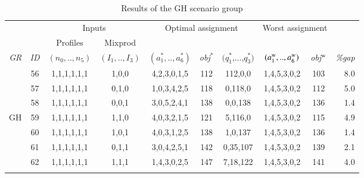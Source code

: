 \documentclass[review,12pt, 3p, times]{elsarticle}
\begin{document}
\begin{longtable}{|c|c|c|c|c|c|c|c|c|r|}
	\hline
	& & \multicolumn{2}{c|}{Inputs} & \multicolumn{3}{c|}{Optimal assignment} & \multicolumn{2}{c|}{Worst assignment }& \\
	& \multicolumn{1}{c|}{ } & \multicolumn{1}{c|}{Profiles} & \multicolumn{1}{c|}{Mixprod}& \multicolumn{1}{c}{}  & \multicolumn{2}{c|}{} & \multicolumn{2}{c|}{}&\multicolumn{1}{c|}{}\\
	\it{GR}            & \it{ID} & \multicolumn{1}{c|}{$(n_0,..,n_5)$} & \multicolumn{1}{c|}{$(I_1,..,I_3)$} & {$(a^*_1,..,a^*_6)$} & \it{obj}$^*$ & $(q^*_1$,...,$q^*_3)$ & {$(a^{\textsc{w}}_1,..,a^{\textsc{w}}_6)$} & \it{obj}$^{\textsc{w}}$ & \it{\%gap} \\ %
									
	\hline 
									
	                   & 56      & 1,1,1,1,1,1                         & 1,0,0                               & 4,2,3,0,1,5          & 112          & 112,0,0               & 1,4,5,3,0,2                                & 103                     & 8.0        \\
	                   & 57      & 1,1,1,1,1,1                         & 0,1,0                               & 1,0,3,4,2,5          & 118          & 0,118,0               & 1,4,5,3,0,2                                & 112                     & 5.0        \\
	                   & 58      & 1,1,1,1,1,1                         & 0,0,1                               & 3,0,5,2,4,1          & 138          & 0,0,138               & 1,4,5,3,0,2                                & 136                     & 1.4        \\
	{GH}\label{SEN:GH} & 59      & 1,1,1,1,1,1                         & 1,1,0                               & 4,0,3,2,1,5          & 121          & 5,116,0               & 1,4,5,3,0,2                                & 115                     & 4.9        \\
	                   & 60      & 1,1,1,1,1,1                         & 1,0,1                               & 4,0,3,1,2,5          & 138          & 1,0,137               & 1,4,5,3,0,2                                & 136                     & 1.4        \\
	                   & 61      & 1,1,1,1,1,1                         & 0,1,1                               & 3,0,4,2,5,1          & 142          & 0,35,107              & 1,4,5,3,0,2                                & 139                     & 2.1        \\
	                   & 62      & 1,1,1,1,1,1                         & 1,1,1                               & 1,4,3,0,2,5          & 147          & 7,18,122              & 1,4,5,3,0,2                                & 141                     & 4.0        \\
									
									        
	\hline
	\caption{Results of the GH scenario group} 
	\label{tab:tr4}
\end{longtable}
			
\end{document}
